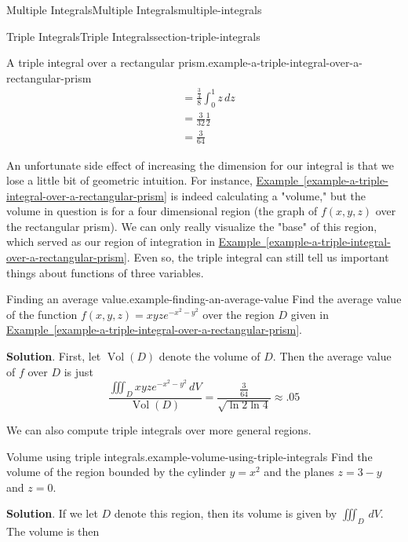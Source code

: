 \documentclass[oneside,10pt,]{book}
\numberwithin{equation}{section}
\begin{document}
\begin{chapterptx}{Multiple Integrals}{}{Multiple Integrals}{}{}{multiple-integrals}
\begin{sectionptx}{Triple Integrals}{}{Triple Integrals}{}{}{section-triple-integrals}
\begin{example}{A triple integral over a rectangular prism.}{example-a-triple-integral-over-a-rectangular-prism}
\begin{align*}
& = \frac{\frac{3}{4}}{8}\int_{0}^{1}z\,dz \\
& = \frac{3}{32}\frac{1}{2} \\
& = \frac{3}{64} 
\end{align*}
%
\end{example}
\hypertarget{p-1514}{}%
An unfortunate side effect of increasing the dimension for our integral is that we lose a little bit of geometric intuition. For instance, \hyperref[example-a-triple-integral-over-a-rectangular-prism]{Example~\ref{example-a-triple-integral-over-a-rectangular-prism}} is indeed calculating a "volume," but the volume in question is for a four dimensional region (the graph of \(f(x,y,z)\) over the rectangular prism). We can only really visualize the "base" of this region, which served as our region of integration in \hyperref[example-a-triple-integral-over-a-rectangular-prism]{Example~\ref{example-a-triple-integral-over-a-rectangular-prism}}. Even so, the triple integral can still tell us important things about functions of three variables.%
\begin{example}{Finding an average value.}{example-finding-an-average-value}%
\hypertarget{p-1515}{}%
Find the average value of the function \(f(x,y,z) = xyze^{-x^{2} - y^{2}}\) over the region \(D\) given in \hyperref[example-a-triple-integral-over-a-rectangular-prism]{Example~\ref{example-a-triple-integral-over-a-rectangular-prism}}.%
\par\smallskip%
\noindent\textbf{Solution}.\hypertarget{solution-249}{}\quad%
\hypertarget{p-1516}{}%
First, let \(\operatorname{Vol}(D)\) denote the volume of \(D\). Then the average value of \(f\) over \(D\) is just%
\begin{equation*}
\frac{\iiint_{D}xyze^{-x^{2} - y^{2}}\,dV}{\operatorname{Vol}(D)} = \frac{\frac{3}{64}}{\sqrt{\ln2\ln4}} \approx .05
\end{equation*}
%
\end{example}
\hypertarget{p-1517}{}%
We can also compute triple integrals over more general regions.%
\begin{example}{Volume using triple integrals.}{example-volume-using-triple-integrals}%
\hypertarget{p-1518}{}%
Find the volume of the region bounded by the cylinder \(y = x^{2}\) and the planes \(z = 3-y\) and \(z=0\).%
\par\smallskip%
\noindent\textbf{Solution}.\hypertarget{solution-250}{}\quad%
\hypertarget{p-1519}{}%
If we let \(D\) denote this region, then its volume is given by \(\iiint_{D}\,dV\). The volume is then%
\begin{align*}

\end{align*}
\end{example}
\end{sectionptx}
\end{chapterptx}
\end{document}
